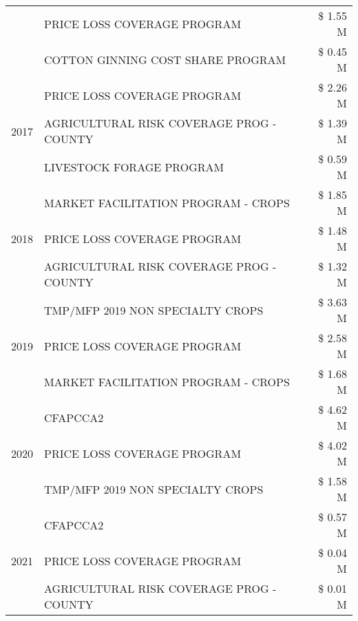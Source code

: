 \begin{tabular}{llr}
 & PRICE LOSS COVERAGE PROGRAM & \$ 1.55 M \\
 & COTTON GINNING COST SHARE PROGRAM & \$ 0.45 M \\
\cline{1-3}
\multirow[t]{3}{*}{2017} & PRICE LOSS COVERAGE PROGRAM & \$ 2.26 M \\
 & AGRICULTURAL RISK COVERAGE PROG - COUNTY & \$ 1.39 M \\
 & LIVESTOCK FORAGE PROGRAM & \$ 0.59 M \\
\cline{1-3}
\multirow[t]{3}{*}{2018} & MARKET FACILITATION PROGRAM - CROPS & \$ 1.85 M \\
 & PRICE LOSS COVERAGE PROGRAM & \$ 1.48 M \\
 & AGRICULTURAL RISK COVERAGE PROG - COUNTY & \$ 1.32 M \\
\cline{1-3}
\multirow[t]{3}{*}{2019} & TMP/MFP 2019 NON SPECIALTY CROPS & \$ 3.63 M \\
 & PRICE LOSS COVERAGE PROGRAM & \$ 2.58 M \\
 & MARKET FACILITATION PROGRAM - CROPS & \$ 1.68 M \\
\cline{1-3}
\multirow[t]{3}{*}{2020} & CFAPCCA2 & \$ 4.62 M \\
 & PRICE LOSS COVERAGE PROGRAM & \$ 4.02 M \\
 & TMP/MFP 2019 NON SPECIALTY CROPS & \$ 1.58 M \\
\cline{1-3}
\multirow[t]{3}{*}{2021} & CFAPCCA2 & \$ 0.57 M \\
 & PRICE LOSS COVERAGE PROGRAM & \$ 0.04 M \\
 & AGRICULTURAL RISK COVERAGE PROG - COUNTY & \$ 0.01 M \\
\cline{1-3}
\bottomrule
\end{tabular}
